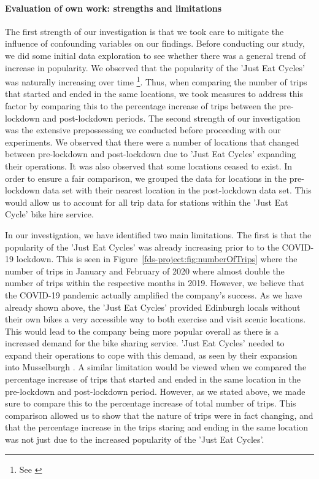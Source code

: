 \documentclass[11pt,a4paper]{article}
\begin{document}
\paragraph{Evaluation of own work: strengths and limitations}\label{evaluation}
The first strength of our investigation is that we took care to mitigate the influence of confounding variables on our findings. Before conducting our study, we did some initial data exploration to see whether there was a general trend of increase in popularity. We observed that the popularity of the 'Just Eat Cycles' was naturally increasing over time \footnote{See \emph{}}. Thus, when comparing the number of trips that started and ended in the same locations, we took measures to address this factor by comparing this to the percentage increase of trips between the pre-lockdown and post-lockdown periods. The second strength of our investigation was the extensive prepossessing we conducted before proceeding with our experiments. We observed that there were a number of locations that changed between pre-lockdown and post-lockdown due to 'Just Eat Cycles' expanding their operations. It was also observed that some locations ceased to exist. In order to ensure a fair comparison, we grouped the data for locations in the pre-lockdown data set with their nearest location in the post-lockdown data set. This would allow us to account for all trip data for stations within the 'Just Eat Cycle' bike hire service.\par In our investigation, we have identified two main limitations. The first is that the popularity of the 'Just Eat Cycles' was already increasing prior to to the COVID-19 lockdown. This is seen in Figure~\ref{fds-project:fig:numberOfTrips} where the number of trips in January and February of 2020 where almost double the number of trips within the respective months in 2019. However, we believe that the COVID-19 pandemic actually amplified the company's success. As we have already shown above, the 'Just Eat Cycles' provided Edinburgh locals without their own bikes a very accessible way to both exercise and visit scenic locations. This would lead to the company being more popular overall as there is a increased demand for the bike sharing service. 'Just Eat Cycles' needed to expand their operations to cope with this demand, as seen by their expansion into Musselburgh \cite{Dalton1}. A similar limitation would be viewed when we compared the percentage increase of trips that started and ended in the same location in the pre-lockdown and post-lockdown period. However, as we stated above, we made sure to compare this to the percentage increase of total number of trips. This comparison allowed us to show that the nature of trips were in fact changing, and that the percentage increase in the trips staring and ending in the same location was not just due to the increased popularity of the 'Just Eat Cycles'.
\end{document}
